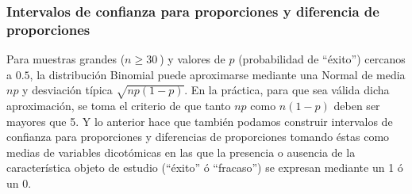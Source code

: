 \documentclass[a4paper]{article}
\begin{document}
\subsubsection {Intervalos de confianza para proporciones y
diferencia de proporciones}

Para muestras grandes ($n\geq30~$) y valores de $p$ (probabilidad
de ``éxito'') cercanos a $0.5$, la distribución Binomial puede
aproximarse mediante una Normal de media $np$ y desviación típica
$\sqrt {np(1-p)}$. En la práctica, para que sea válida dicha
aproximación, se toma el criterio de que tanto $np$ como $n(1-p)$
deben ser mayores que 5. Y lo anterior hace que también podamos
construir intervalos de confianza para proporciones y diferencias
de proporciones tomando éstas como medias de variables dicotómicas
en las que la presencia o ausencia de la característica objeto de
estudio (``éxito'' ó ``fracaso'') se expresan mediante un 1 ó un 0.
\end{document}
